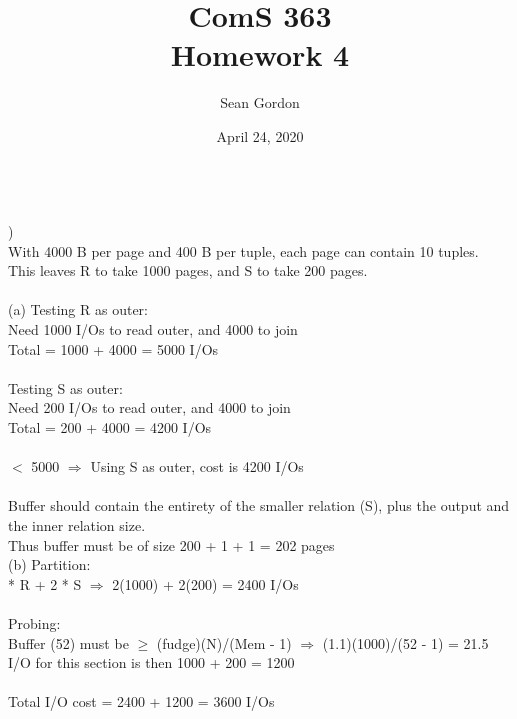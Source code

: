 \documentclass[12pt]{article}
\title{ComS 363\\Homework 4}
\author{Sean Gordon}
\date{April 24, 2020}
\begin{document}
\maketitle


\hrulefill \\



)\\
\indent \indent With 4000 B per page and 400 B per tuple, each page can contain 10 tuples.\\
\indent \indent This leaves R to take 1000 pages, and S to take 200 pages.\\\\
\indent (a) Testing R as outer:\\
\indent \indent Need 1000 I/Os to read outer, and 4000 to join\\
\indent \indent Total = 1000 + 4000 = 5000 I/Os\\\\
\indent \indent Testing S as outer:\\
\indent \indent Need 200 I/Os to read outer, and 4000 to join\\
\indent \indent Total = 200 + 4000 = 4200 I/Os\\\\
\indent {} $<$ 5000 $\Rightarrow$ Using S as outer, cost is 4200 I/Os\\\\
\indent \indent Buffer should contain the entirety of the smaller relation (S), plus the output and \\
\indent \indent the inner relation size.\\
\indent \indent Thus buffer must be of size 200 + 1 + 1 = 202 pages\\


\indent (b) Partition:\\
\indent {} * R + 2 * S $\Rightarrow$ 2(1000) + 2(200) = 2400 I/Os\\\\
\indent \indent Probing:\\
\indent \indent Buffer (52) must be $\ge$ (fudge)(N)/(Mem - 1) $\Rightarrow$ (1.1)(1000)/(52 - 1) = 21.5 \checkmark \\
\indent \indent I/O for this section is then 1000 + 200 = 1200\\\\
\indent \indent Total I/O cost = 2400 + 1200 = 3600 I/Os\\

\pagebreak
\end{document}
